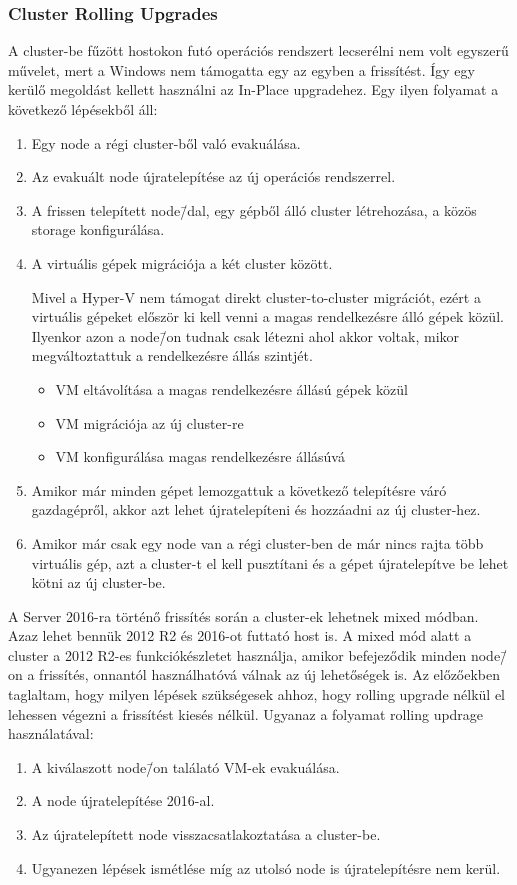 \documentclass[12pt,oneside,justify,table]{book}
\begin{document}
\subsubsection{Cluster Rolling Upgrades}

A cluster-be fűzött hostokon futó operációs rendszert lecserélni nem volt egyszerű művelet, mert a Windows nem támogatta egy az egyben a frissítést. Így egy kerülő megoldást kellett használni az In-Place upgradehez. Egy ilyen folyamat a következő lépésekből áll:
\begin{enumerate}
	\item Egy node a régi cluster-ből való evakuálása.
	\item Az evakuált node újratelepítése az új operációs rendszerrel.
	\item A frissen telepített node\=/dal, egy gépből álló cluster létrehozása, a közös storage konfigurálása.
 	\item A virtuális gépek migrációja a két cluster között.

Mivel a Hyper-V nem támogat direkt cluster-to-cluster migrációt, ezért a virtuális gépeket először ki kell venni a magas rendelkezésre álló gépek közül. Ilyenkor azon a node\=/on tudnak csak létezni ahol akkor voltak, mikor megváltoztattuk a rendelkezésre állás szintjét.
	\begin{itemize}
		
		\item VM eltávolítása a magas rendelkezésre állású gépek közül
		\item VM migrációja az új cluster-re
		\item VM konfigurálása magas rendelkezésre állásúvá
	\end{itemize}
	\item Amikor már minden gépet lemozgattuk a következő telepítésre váró gazdagépről, akkor azt lehet újratelepíteni és hozzáadni az új cluster-hez.
	\item Amikor már csak egy node van a régi cluster-ben de már nincs rajta több virtuális gép, azt a cluster-t el kell pusztítani és a gépet újratelepítve be lehet kötni az új cluster-be.
\end{enumerate}

A Server 2016-ra történő frissítés során a cluster-ek lehetnek mixed módban. Azaz lehet bennük 2012 R2 és 2016-ot futtató host is. A mixed mód alatt a cluster a 2012 R2-es funkciókészletet használja, amikor befejeződik minden node\=/on a frissítés, onnantól használhatóvá válnak az új lehetőségek is. Az előzőekben taglaltam, hogy milyen lépések szükségesek ahhoz, hogy rolling upgrade nélkül el lehessen végezni a frissítést kiesés nélkül. 
Ugyanaz a folyamat rolling updrage használatával:
\begin{enumerate}
	\item A kiválaszott node\=/on találató VM-ek evakuálása.
	\item A node újratelepítése 2016-al.
	\item Az újratelepített node visszacsatlakoztatása a cluster-be. 
	\item Ugyanezen lépések ismétlése míg az utolsó node is újratelepítésre nem kerül.
\end{enumerate}
\end{document}
